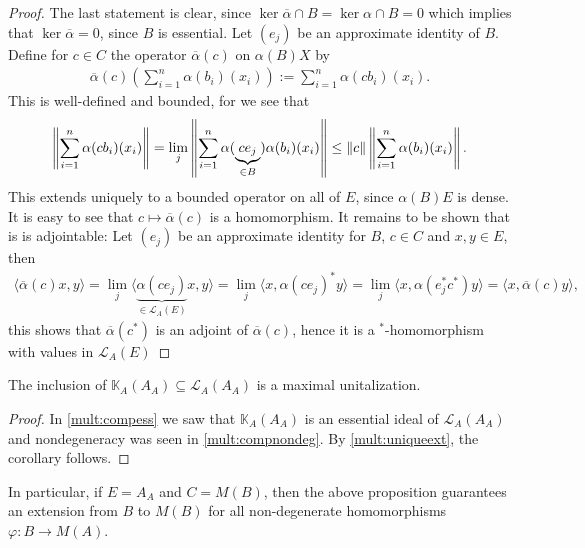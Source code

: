 \begin{proof}
	The last statement is clear, since $\ker \overline \alpha \cap B = \ker \alpha \cap B = 0$ which implies that $\ker \overline \alpha = 0$, since $B$ is essential. Let $(e_j)$ be an approximate identity of $B$. Define for $c \in C$ the operator $\overline \alpha(c)$ on $\alpha(B)X$ by
	\begin{align*}
		\overline \alpha(c) \left( \sum_{i=1}^n \alpha(b_i)(x_i) \right):= \sum_{i=1}^n \alpha(c b_i) (x_i).
	\end{align*}
	This is well-defined and bounded, for we see that
	\begin{align*}
		\left\lVert \sum_{i=1}^n \alpha(c b_i) (x_i) \right\rVert = \lim_{j} \left\lVert \sum_{i=1}^n \alpha(\underbrace{c e_j}_{\in B})\alpha(b_i) (x_i) \right\rVert \leq \left\lVert c \right\rVert \left\lVert \sum_{i=1}^n \alpha(b_i) (x_i)\right\rVert.
	\end{align*}
	This extends uniquely to a bounded operator on all of $E$, since $\alpha(B)E$ is dense. It is easy to see that $c \mapsto \overline \alpha(c)$ is a homomorphism. It remains to be shown that is is adjointable: Let $(e_j)$ be an approximate identity for $B$, $c \in C$ and $x,y \in E$, then
	\begin{align*}
		\langle \overline \alpha(c) x,y \rangle = \lim_{j} \langle \underbrace{\alpha(ce_j)}_{\in \mathcal{L}_A(E)} x, y \rangle = \lim_j \langle x , \alpha(ce_j)^* y\rangle = \lim_j  \langle x , \alpha(e_j^*c^*) y\rangle =  \langle  x, \overline \alpha(c) y\rangle,
	\end{align*}
	this shows that $\overline \alpha(c^*)$ is an adjoint of $\overline \alpha (c)$, hence it is a $^*$-homomorphism with values in $\mathcal{L}_A(E)$
\end{proof}
\begin{corollary}
	The inclusion of $\mathbb{K}_A(A_A) \subseteq \mathcal{L}_A(A_A)$ is a maximal unitalization.	
\end{corollary}
\begin{proof}
	In \ref{mult:compess} we saw that $\mathbb{K}_A(A_A)$ is an essential ideal of $\mathcal{L}_A(A_A)$ and nondegeneracy was seen in \ref{mult:compnondeg}. By \ref{mult:uniqueext}, the corollary follows.
\end{proof}
In particular, if $E=A_A$ and $C = M(B)$, then the above proposition guarantees an extension from $B$ to $M(B)$ for all non-degenerate homomorphisms $\varphi \colon B \to M(A)$.

